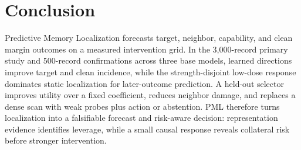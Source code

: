 \section{Conclusion}

Predictive Memory Localization forecasts target, neighbor, capability, and
clean margin outcomes on a measured intervention grid. In the 3,000-record
primary study and 500-record confirmations across three base models, learned
directions improve target and clean incidence,
while the strength-disjoint low-dose response dominates static localization for
later-outcome prediction. A held-out selector improves utility over a fixed
coefficient, reduces neighbor damage, and replaces a dense scan with weak
probes plus action or abstention. PML therefore turns localization into a
falsifiable forecast and risk-aware decision: representation evidence identifies
leverage, while a small causal response reveals collateral risk before stronger
intervention.
